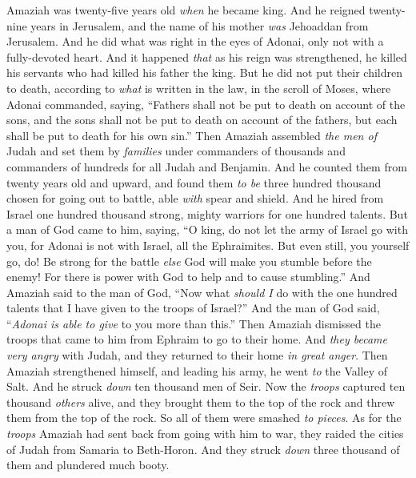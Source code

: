 \begin{biblechapter} %
 Amaziah was twenty-five years old \textit{when} he became king. And he reigned twenty-nine years in Jerusalem, and the name of his mother \textit{was} Jehoaddan from Jerusalem.
\verse And he did what was right in the eyes of Adonai, only not with a fully-devoted heart.
\verse And it happened \textit{that} as his reign was strengthened, he killed his servants who had killed his father the king.
\verse But he did not put their children to death, according to \textit{what} is written in the law, in the scroll of Moses, where Adonai commanded, saying, “Fathers shall not be put to death on account of the sons, and the sons shall not be put to death on account of the fathers, but each shall be put to death for his own sin.”
\verse Then Amaziah assembled \textit{the men of} Judah and set them by \textit{families} under commanders of thousands and commanders of hundreds for all Judah and Benjamin. And he counted them from twenty years old and upward, and found them \textit{to be} three hundred thousand chosen for going out to battle, able \textit{with} spear and shield.
\verse And he hired from Israel one hundred thousand strong, mighty warriors for one hundred talents.
\verse But a man of God came to him, saying, “O king, do not let the army of Israel go with you, for Adonai is not with Israel, all the Ephraimites.
\verse But even still, you yourself go, do! Be strong for the battle \textit{else} God will make you stumble before the enemy! For there is power with God to help and to cause stumbling.”
\verse And Amaziah said to the man of God, “Now what \textit{should I} do with the one hundred talents that I have given to the troops of Israel?” And the man of God said, “\textit{Adonai is able to give} to you more than this.”
\verse Then Amaziah dismissed the troops that came to him from Ephraim to go to their home. And \textit{they became very angry} with Judah, and they returned to their home \textit{in great anger}.
\verse Then Amaziah strengthened himself, and leading his army, he went \textit{to} the Valley of Salt. And he struck \textit{down} ten thousand men of Seir.
\verse Now the \textit{troops} captured ten thousand \textit{others} alive, and they brought them to the top of the rock and threw them from the top of the rock. So all of them were smashed \textit{to pieces}.
\verse As for the \textit{troops} Amaziah had sent back from going with him to war, they raided the cities of Judah from Samaria to Beth-Horon. And they struck \textit{down} three thousand of them and plundered much booty.

\end{biblechapter}
